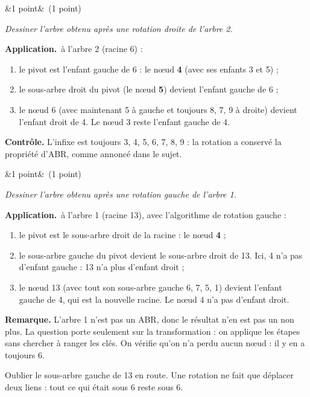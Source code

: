 \documentclass[11pt, a4paper]{exam}
\newcommand{\Q}[3]{\par\needspace{5\baselineskip}\bigskip\noindent{\large\bfseries Question #1}\ifx&#2&\else\ \textnormal{(#2)}\fi\par\nopagebreak\smallskip\noindent\textit{#3}\par\nopagebreak\smallskip}
\newcommand{\application}{\par\noindent\textbf{Application.}\ }
\begin{document}
\Q{6 (a)}{1 point}{Dessiner l'arbre obtenu après une rotation droite de l'arbre 2.}
\begin{reponse}
\begin{center}
\end{center}
\end{reponse}
\application à l'arbre 2 (racine 6) :
\begin{enumerate}
\item le pivot est l'enfant gauche de 6 : le nœud \textbf{4} (avec ses enfants 3 et 5) ;
\item le sous-arbre droit du pivot (le nœud \textbf{5}) devient l'enfant gauche de 6 ;
\item le nœud 6 (avec maintenant 5 à gauche et toujours 8, 7, 9 à droite) devient l'enfant droit de 4. Le nœud 3 reste l'enfant gauche de 4.
\end{enumerate}
\textbf{Contrôle.} L'infixe est toujours 3, 4, 5, 6, 7, 8, 9 : la rotation a conservé la propriété d'ABR, comme annoncé dans le sujet.

\Q{6 (b)}{1 point}{Dessiner l'arbre obtenu après une rotation gauche de l'arbre 1.}
\begin{reponse}
\begin{center}
\end{center}
\end{reponse}
\application à l'arbre 1 (racine 13), avec l'algorithme de rotation gauche :
\begin{enumerate}
\item le pivot est le sous-arbre droit de la racine : le nœud \textbf{4} ;
\item le sous-arbre gauche du pivot devient le sous-arbre droit de 13. Ici, 4 n'a pas d'enfant gauche : 13 n'a plus d'enfant droit ;
\item le nœud 13 (avec tout son sous-arbre gauche 6, 7, 5, 1) devient l'enfant gauche de 4, qui est la nouvelle racine. Le nœud 4 n'a pas d'enfant droit.
\end{enumerate}
\textbf{Remarque.} L'arbre 1 n'est pas un ABR, donc le résultat n'en est pas un non plus. La question porte seulement sur la transformation : on applique les étapes sans chercher à ranger les clés. On vérifie qu'on n'a perdu aucun nœud : il y en a toujours 6.
\begin{erreur}
Oublier le sous-arbre gauche de 13 en route. Une rotation ne fait que déplacer deux liens : tout ce qui était sous 6 reste sous 6.
\end{erreur}
\end{document}

